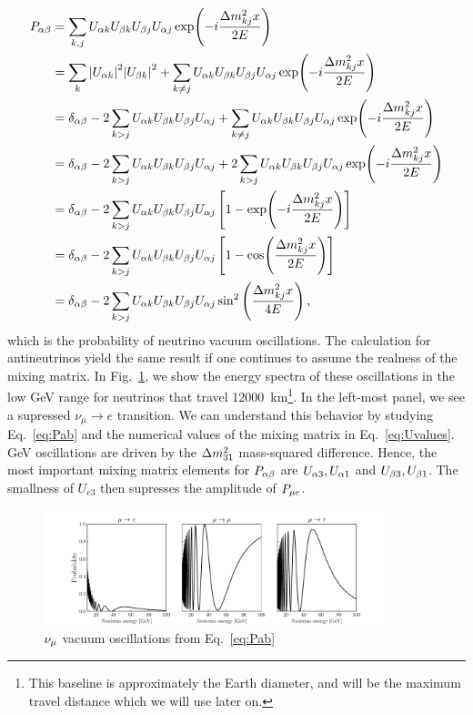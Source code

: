 \begin{align}\label{eq:Pab}%
    P_{\ab} &= \sum_{k,j} U_{\a k}U_{\b k}U_{\b j}U_{\a j} \exp(-i\frac{\dm_{kj}x}{2E}) \nonumber \\
            &=  \sum_k \abs{U_{\a k}}^2\abs{U_{\b k}}^2 + \sum_{k \neq j} U_{\a k}U_{\b k}U_{\b j}U_{\a j} \exp(-i\frac{\dm_{kj}x}{2E}) \nonumber \\
            &= \delta_{\a \b} - 2 \sum_{k>j}U_{\a k} U_{\b k} U_{\b j} U_{\a j} +\sum_{k \neq j} U_{\a k}U_{\b k}U_{\b j}U_{\a j} \exp(-i\frac{\dm_{kj}x}{2E}) \nonumber \\
            &= \delta_{\a \b} - 2 \sum_{k>j}U_{\a k} U_{\b k} U_{\b j} U_{\a j} + 2\sum_{k > j} U_{\a k}U_{\b k}U_{\b j}U_{\a j} \exp(-i\frac{\dm_{kj}x}{2E}) \nonumber \\
            &= \delta_{\a \b} - 2\sum_{k > j} U_{\a k}U_{\b k}U_{\b j}U_{\a j} \left[1-\exp(-i\frac{\dm_{kj}x}{2E})\right] \nonumber \\
            &= \delta_{\a \b} - 2\sum_{k > j} U_{\a k}U_{\b k}U_{\b j}U_{\a j} \left[1-\cos(\frac{\dm_{kj}x}{2E})\right] \nonumber \\
            &= \delta_{\a \b} - 2\sum_{k > j} U_{\a k}U_{\b k}U_{\b j}U_{\a j} \sin^2{\left(\frac{\dm_{kj}x}{4E}\right)}\,,
\end{align}
which is the probability of neutrino vacuum oscillations. %
The calculation for antineutrinos yield the same result if one continues to assume the realness of the mixing matrix. 
In Fig.~\ref{fig:vac_osc}, we show the energy spectra of these oscillations in the low \si{\GeV} range for neutrinos that travel \SI{12000}{\km}\footnote{This baseline
is approximately the Earth diameter, and will be the maximum travel distance which we will use later on.}.
In the left-most panel, we see a supressed $\nu_\mu \to e$ transition. We can understand this behavior by studying Eq.~\ref{eq:Pab} and the 
numerical values of the mixing matrix in Eq.~\ref{eq:Uvalues}.
\si{\GeV} oscillations are driven by the $\dm[31]$ mass-squared difference. Hence, the most important mixing matrix 
elements for $P_{\alpha\beta}$ are $U_{\alpha3}, U_{\alpha1}$ and $U_{\beta3}, U_{\beta1}$. The smallness of $U_{e3}$ then supresses the
amplitude of $P_{\mu e}$.
\begin{figure}
    \centering
    \includegraphics[width=0.9\textwidth]{figures/vac_osc.pdf}
    \caption{$\nu_\mu$ vacuum oscillations from Eq.~\ref{eq:Pab}}\label{fig:vac_osc}
\end{figure}

